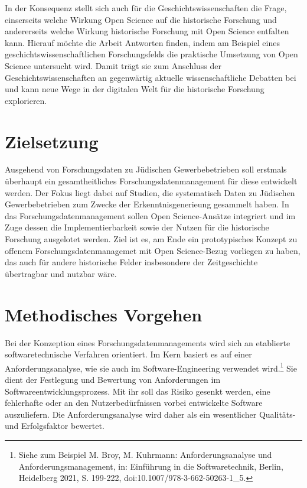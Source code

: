In der Konsequenz stellt sich auch für die Geschichtswissenschaften die Frage, einserseits welche Wirkung Open Science auf die historische Forschung und andererseits welche Wirkung historische Forschung mit Open Science entfalten kann. Hierauf möchte die Arbeit Antworten finden, indem am Beispiel eines geschichtswissenschaftlichen Forschungsfelds die praktische Umsetzung von Open Science untersucht wird. Damit trägt sie zum Anschluss der Geschichtswissenschaften an gegenwärtig aktuelle wissenschaftliche Debatten bei und kann neue Wege in der digitalen Welt für die historische Forschung explorieren. 

\section{Zielsetzung}

Ausgehend von Forschungsdaten zu Jüdischen Gewerbebetrieben soll erstmals überhaupt ein gesamtheitliches Forschungsdatenmanagement für diese entwickelt werden. Der Fokus liegt dabei auf Studien, die systematisch Daten zu Jüdischen Gewerbebetrieben zum Zwecke der Erkenntnisgenerieung gesammelt haben. In das Forschungsdatenmanagement sollen Open Science-Ansätze integriert und im Zuge dessen die Implementierbarkeit sowie der Nutzen für die historische Forschung ausgelotet werden. Ziel ist es, am Ende ein prototypisches Konzept zu offenem Forschungsdatenmanagemet mit Open Science-Bezug vorliegen zu haben, das auch für andere historische Felder insbesondere der Zeitgeschichte übertragbar und nutzbar wäre.

\section{Methodisches Vorgehen}

Bei der Konzeption eines Forschungsdatenmanagements wird sich an etablierte softwaretechnische Verfahren orientiert. Im Kern basiert es auf einer Anforderungsanalyse, wie sie auch im Software-Engineering verwendet wird.\footnote{Siehe zum Beispiel M. Broy, M. Kuhrmann: Anforderungsanalyse und Anforderungsmanagement, in: Einführung in die Softwaretechnik, Berlin, Heidelberg 2021, S. 199-222, doi:10.1007/978-3-662-50263-1\_5.} Sie dient der Festlegung und Bewertung von Anforderungen im Softwareentwicklungsprozess. Mit ihr soll das Risiko gesenkt werden, eine fehlerhafte oder an den Nutzerbedürfnissen vorbei entwickelte Software auszuliefern. Die Anforderungsanalyse wird daher als ein wesentlicher Qualitäts- und Erfolgsfaktor bewertet.

